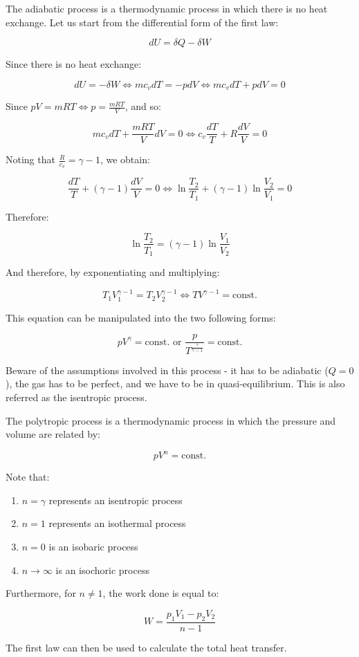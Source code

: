 \documentclass{article}
\begin{document}
\begin{proposition}
    The adiabatic process is a thermodynamic process in which there is no heat exchange. Let us start from the differential form of the first law:

    \[ dU = \delta Q - \delta W \]

    Since there is no heat exchange:

    \[ dU = -\delta W \iff m c_v dT = -pdV \iff m c_v dT + pdV = 0 \]

    Since $pV = mRT \iff p = \frac{mRT}{V}$, and so:

    \[ mc_vdT + \frac{mRT}{V}dV = 0 \iff c_v \frac{dT}{T} + R\frac{dV}{V} = 0 \]

    Noting that $\frac{R}{c_v} = \gamma - 1$, we obtain:

    \[ \frac{dT}{T} + (\gamma - 1) \frac{dV}{V} = 0 \iff \ln{\frac{T_2}{T_1}} + (\gamma - 1)\ln{\frac{V_2}{V_1}} = 0 \]

    Therefore:

    \[ \ln{\frac{T_2}{T_1}} = (\gamma - 1)\ln{\frac{V_1}{V_2}} \]

    And therefore, by exponentiating and multiplying:

    \[ T_1V_1^{\gamma - 1} = T_2V_2^{\gamma - 1} \iff TV^{\gamma - 1} = \text{const.} \]

    This equation can be manipulated into the two following forms:

    \[ pV^\gamma = \text{const.} \text{   or   } \frac{p}{T^{\frac{\gamma}{\gamma - 1}}} = \text{const.} \]
\end{proposition}

Beware of the assumptions involved in this process - it has to be adiabatic ($Q = 0$), the gas has to be perfect, and we have to be in quasi-equilibrium. This is also referred as the isentropic process.

\begin{proposition}
    The polytropic process is a thermodynamic process in which the pressure and volume are related by:

    \[ pV^n = \text{const.} \]

    Note that:

    \begin{enumerate}
        \item $n = \gamma$ represents an isentropic process
        \item $n = 1$ represents an isothermal process
        \item $n = 0$ is an isobaric process
        \item $n \to \infty$ is an isochoric process
    \end{enumerate}

    Furthermore, for $n \neq 1$, the work done is equal to:

    \[ W = \frac{p_1V_1 - p_2V_2}{n - 1} \]

    The first law can then be used to calculate the total heat transfer.
\end{proposition}
\end{document}
